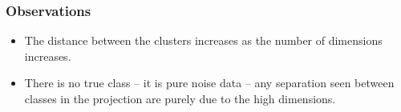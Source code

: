 \documentclass{beamer}
\begin{document}
\begin{frame}
\frametitle{Observations}
\begin{itemize}
\item The distance between the clusters increases as the number of dimensions increases.
\item There is no true class -- it is pure noise data -- any separation seen between classes in the projection are purely due to the high dimensions.
\end{itemize}
\end{frame}



%		
\end{document}
